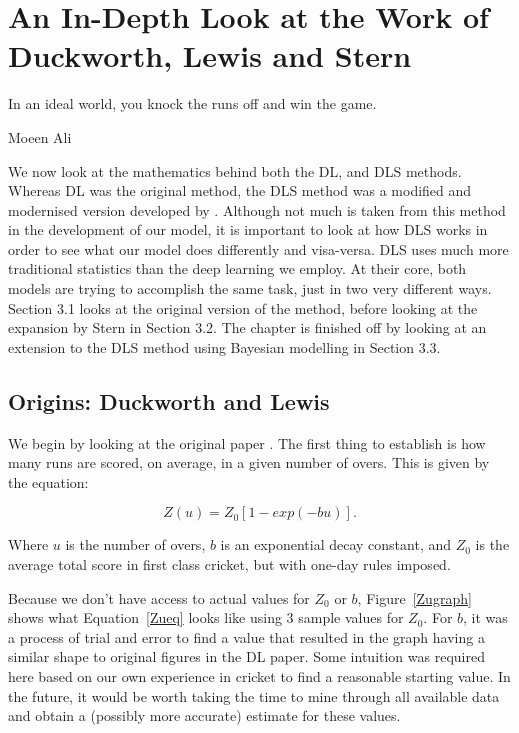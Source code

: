 \chapter{An In-Depth Look at the Work of Duckworth, Lewis and Stern}

\epigraph{In an ideal world, you knock the runs off and win the game.}{Moeen Ali}

We now look at the mathematics behind both the DL, and DLS methods. Whereas DL was the original
method, the DLS method was a modified and modernised version developed by \cite{stern}. Although not much is taken from this method 
in the development of our model, it is important to look at how DLS works in order to see what our model does differently 
and visa-versa. DLS uses much more traditional statistics than the deep learning we employ. At their core, both models are trying to accomplish 
the same task, just in two very different ways. \\

Section 3.1 looks at the original version of the method, before looking at the expansion by Stern in Section 3.2. The chapter is finished 
off by looking at an extension to the DLS method using Bayesian modelling in Section 3.3.

\section{Origins: Duckworth and Lewis}
We begin by looking at the original paper \cite{duckworth}. The first thing to establish is how many runs are scored,
on average, in a given number of overs. This is given by the equation:

\begin{equation}
    Z(u) = Z_0[1-exp(-bu)].
    \label{Zueq}  
\end{equation}

Where $u$ is the number of overs, $b$ is an exponential decay constant, and $Z_0$ is the
average total score in first class cricket, but with one-day rules imposed.  

Because we don't have access to actual values for $Z_0$ or $b$, Figure~\ref{Zugraph} shows what Equation~\ref{Zueq} looks 
like using 3 sample values for $Z_0$. For $b$, it was a process of trial and error to find a value
that resulted in the graph having a similar shape to original figures in the DL paper. Some intuition was required here 
based on our own experience in cricket to find a reasonable starting value. In the future, it would be worth taking the time to 
mine through all available data and obtain a (possibly more accurate) estimate for these values. 

